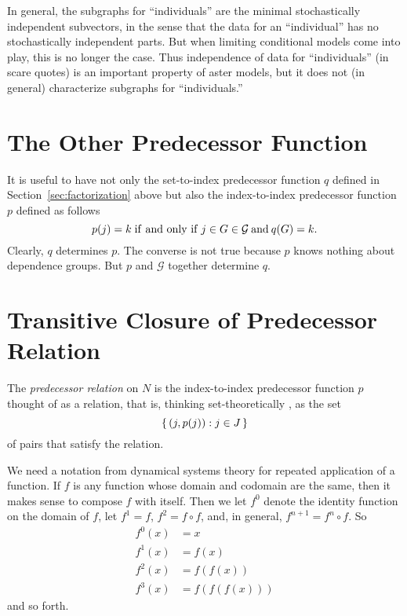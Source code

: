 In general, the subgraphs for ``individuals'' are the minimal stochastically
independent subvectors, in the sense that the data for an ``individual'' has
no stochastically independent parts.  But when limiting conditional models
come into play, this is no longer the case.
Thus independence of data for ``individuals'' (in scare quotes)
is an important property of
aster models, but it does not (in general) characterize
subgraphs for ``individuals.''

\section{The Other Predecessor Function}
\label{sec:other}

It is useful to have not only the set-to-index predecessor function $q$
defined in Section~\ref{sec:factorization} above but also the index-to-index
predecessor function $p$ defined as follows
$$
   p(j) = k \mathrel{\rm if\ and\ only\ if} j \in G \in \mathcal{G} \mathbin{\rm and} q(G) = k.
$$
Clearly, $q$ determines $p$.
The converse is not true because $p$ knows nothing about dependence groups.
But $p$ and $\mathcal{G}$ together determine $q$.

\section{Transitive Closure of Predecessor Relation}
\label{sec:closure}

The \emph{predecessor relation} on $N$ is the index-to-index predecessor
function $p$ thought
of as a relation, that is, thinking set-theoretically
\citep[Section~7]{halmos-set-theory}, as the set
\begin{equation} \label{eq:predecessor-relation}
   \{\,  (j, p(j)) : j \in J  \,\}
\end{equation}
of pairs that satisfy the relation.

We need a notation from dynamical systems theory for repeated application
of a function.  If $f$ is any function whose domain and codomain are the same,
then it makes sense to compose $f$ with itself.  Then we let $f^0$ denote
the identity function on the domain of $f$, let $f^1 = f$, $f^2 = f \circ f$,
and, in general, $f^{n + 1} = f^n \circ f$.
So
\begin{align*}
   f^0(x) & = x
   \\
   f^1(x) & = f(x)
   \\
   f^2(x) & = f(f(x))
   \\
   f^3(x) & = f(f(f(x)))
\end{align*}
and so forth.

